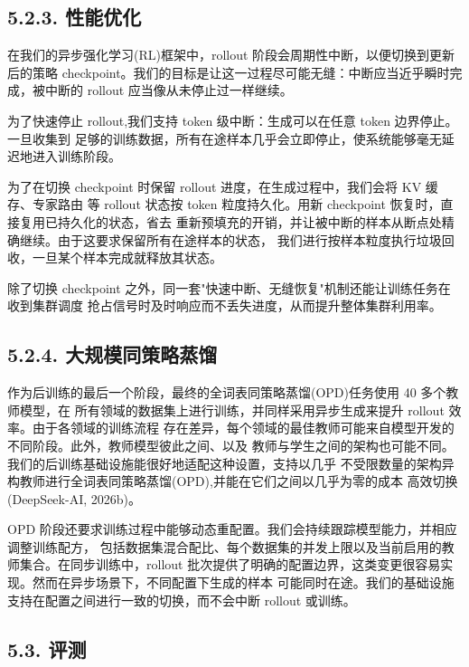 \subsection{5.2.3. 性能优化}\label{performance-optimization}

在我们的异步强化学习(RL)框架中，rollout 阶段会周期性中断，以便切换到更新后的策略
checkpoint。我们的目标是让这一过程尽可能无缝：中断应当近乎瞬时完成，被中断的 rollout
应当像从未停止过一样继续。

为了快速停止 rollout,我们支持 token 级中断：生成可以在任意 token 边界停止。一旦收集到
足够的训练数据，所有在途样本几乎会立即停止，使系统能够毫无延迟地进入训练阶段。

为了在切换 checkpoint 时保留 rollout 进度，在生成过程中，我们会将 KV 缓存、专家路由
等 rollout 状态按 token 粒度持久化。用新 checkpoint 恢复时，直接复用已持久化的状态，省去
重新预填充的开销，并让被中断的样本从断点处精确继续。由于这要求保留所有在途样本的状态，
我们进行按样本粒度执行垃圾回收，一旦某个样本完成就释放其状态。

除了切换 checkpoint 之外，同一套"快速中断、无缝恢复"机制还能让训练任务在收到集群调度
抢占信号时及时响应而不丢失进度，从而提升整体集群利用率。

\subsection{5.2.4. 大规模同策略蒸馏}\label{large-scale-on-policy-distillation}

作为后训练的最后一个阶段，最终的全词表同策略蒸馏(OPD)任务使用 40 多个教师模型，在
所有领域的数据集上进行训练，并同样采用异步生成来提升 rollout 效率。由于各领域的训练流程
存在差异，每个领域的最佳教师可能来自模型开发的不同阶段。此外，教师模型彼此之间、以及
教师与学生之间的架构也可能不同。我们的后训练基础设施能很好地适配这种设置，支持以几乎
不受限数量的架构异构教师进行全词表同策略蒸馏(OPD),并能在它们之间以几乎为零的成本
高效切换 (DeepSeek-AI, 2026b)。



OPD 阶段还要求训练过程中能够动态重配置。我们会持续跟踪模型能力，并相应调整训练配方，
包括数据集混合配比、每个数据集的并发上限以及当前启用的教师集合。在同步训练中，rollout
批次提供了明确的配置边界，这类变更很容易实现。然而在异步场景下，不同配置下生成的样本
可能同时在途。我们的基础设施支持在配置之间进行一致的切换，而不会中断 rollout 或训练。

\subsection{5.3. 评测}\label{evaluation}

